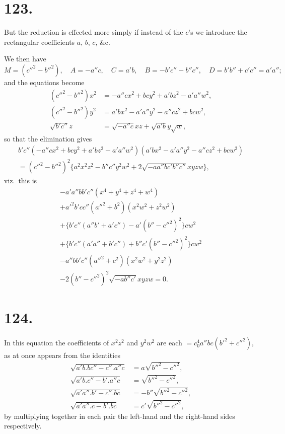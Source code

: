\documentclass[11pt,a4paper]{book}
\begin{document}
\newpage
\section*{123.}
\label{sec:123}

But the reduction is effected more simply if instead of the $c$'s we introduce the rectangular coefficients $a$, $b$, $c$, \&c.

We then have
\[
M = (c''^2 - b''^2), \quad A = -a''c, \quad C = a'b, \quad B = -b'c'' - b''c'', \quad D = b'b'' + c'c'' = a'a'';
\]
and the equations become
\begin{align*}
(c''^2 - b''^2)x^2 &= -a''cx^2 + bcy^2 + a'bz^2 - a'a''w^2, \\
(c''^2 - b''^2)y^2 &= a'bx^2 - a'a''y^2 - a''cz^2 + bcw^2, \\
\sqrt{b'c''}z &= \sqrt{-a''c}xz + \sqrt{a'b}y\sqrt{w},
\end{align*}
so that the elimination gives
\begin{multline*}
b'c''(-a''cx^2 + bcy^2 + a'bz^2 - a'a''w^2)(a'bx^2 - a'a''y^2 - a''cz^2 + bcw^2) \\
= (c''^2 - b''^2)^2\{a^2x^2z^2 - b''c''y^2w^2 + 2\sqrt{-aa''bc'b''c''}xyzw\},
\end{multline*}
viz.\ this is
\begin{multline*}
-a'a''bb'c''(x^4 + y^4 + z^4 + w^4) \\
+ a'^2b'cc''(a''^2 + b^2)(x^2w^2 + z^2w^2) \\
+ \{b'c''(a''b' + a'c'') - a'(b'' - c''^2)^2\}cw^2 \\
+ \{b'c''(a'a'' + b'c'') + b''c'(b'' - c''^2)^2\}cw^2 \\
- a''bb'c''(a''^2 + c^2)(x^2w^2 + y^2z^2) \\
- 2(b'' - c''^2)^2\sqrt{-ab''c'}xyzw = 0.
\end{multline*}

\newpage
\section*{124.}
\label{sec:124}

In this equation the coefficients of $x^2z^2$ and $y^2w^2$ are each $= c_0^4a''bc(b'^2 + c''^2)$, as at once appears from the identities
\begin{align*}
\sqrt{a'b.bc'' - c''.a''c} &= a\sqrt{b''^2 - c''^2}, \\
\sqrt{a'b.c'' - b'.a''c} &= \sqrt{b''^2 - c''^2}, \\
\sqrt{a'a''.b' - c''.bc} &= -b''\sqrt{b''^2 - c''^2}, \\
\sqrt{a'a''.c - b'.bc} &= c'\sqrt{b''^2 - c''^2},
\end{align*}
by multiplying together in each pair the left-hand and the right-hand sides respectively.
\end{document}
